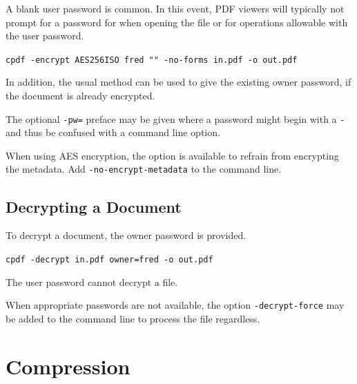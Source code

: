 \documentclass{book}
\begin{document}
  \noindent A blank user password is
common. In this event, PDF viewers will typically not prompt for a
password for when opening the file or for operations allowable with the user password.

  \begin{framed}
    \vspace{1.5mm}
    \noindent\small\verb!cpdf -encrypt AES256ISO fred "" -no-forms in.pdf -o out.pdf!
  \end{framed}

\noindent In addition, the usual method can be used to give the existing owner
password, if the document is already encrypted.

The optional \texttt{-pw=} preface may be given where a password might begin with a \texttt{-} and thus be confused with a command line option.

When using AES encryption, the option is available to refrain from encrypting the
metadata. Add \texttt{-no-encrypt-metadata} to the command line.

  \section{Decrypting a Document}
  To decrypt a document, the owner password is provided.

  \begin{framed}
    \noindent\small\verb!cpdf -decrypt in.pdf owner=fred -o out.pdf!
  \end{framed}

  \noindent The user password cannot decrypt a file.

When appropriate passwords are not available, the option \texttt{-decrypt-force} may be added to the command line to process the file regardless.

\chapter{Compression}\label{chap:5}
\end{document}
